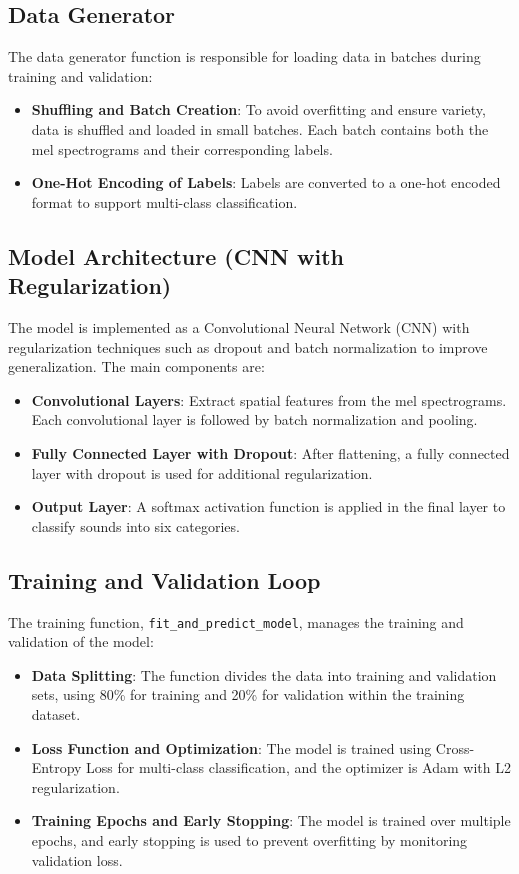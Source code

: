 \documentclass[conference]{IEEEtran}
\begin{document}
\subsection{Data Generator}
The data generator function is responsible for loading data in batches during training and validation:
\begin{itemize}
    \item \textbf{Shuffling and Batch Creation}: To avoid overfitting and ensure variety, data is shuffled and loaded in small batches. Each batch contains both the mel spectrograms and their corresponding labels.
    \item \textbf{One-Hot Encoding of Labels}: Labels are converted to a one-hot encoded format to support multi-class classification.
\end{itemize}

\subsection{Model Architecture (CNN with Regularization)}
The model is implemented as a Convolutional Neural Network (CNN) with regularization techniques such as dropout and batch normalization to improve generalization. The main components are:
\begin{itemize}
    \item \textbf{Convolutional Layers}: Extract spatial features from the mel spectrograms. Each convolutional layer is followed by batch normalization and pooling.
    \item \textbf{Fully Connected Layer with Dropout}: After flattening, a fully connected layer with dropout is used for additional regularization.
    \item \textbf{Output Layer}: A softmax activation function is applied in the final layer to classify sounds into six categories.
\end{itemize}

\subsection{Training and Validation Loop}
The training function, \texttt{fit\_and\_predict\_model}, manages the training and validation of the model:
\begin{itemize}
    \item \textbf{Data Splitting}: The function divides the data into training and validation sets, using 80\% for training and 20\% for validation within the training dataset.
    \item \textbf{Loss Function and Optimization}: The model is trained using Cross-Entropy Loss for multi-class classification, and the optimizer is Adam with L2 regularization.
    \item \textbf{Training Epochs and Early Stopping}: The model is trained over multiple epochs, and early stopping is used to prevent overfitting by monitoring validation loss.
\end{itemize}
\end{document}
